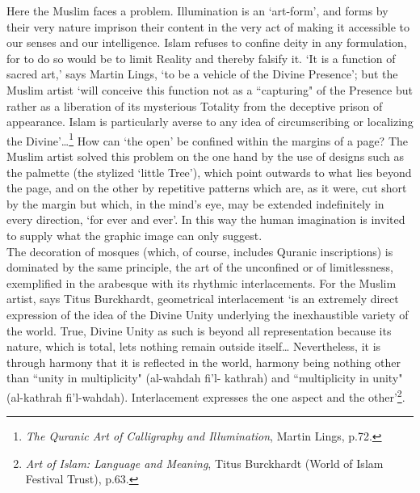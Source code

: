 \documentclass[10pt, twoside,openright]{book}
\begin{document}
Here the Muslim faces a problem. Illumination is an `art\hyp{}form', and forms by their very nature 
imprison their content in the very act of making it accessible to our senses and our intelligence. 
Islam refuses to confine deity in any formulation, for to do so would be to limit Reality and thereby 
falsify it. `It is a function of sacred art,' says Martin Lings, `to be a vehicle of the Divine 
Presence'; but the Muslim artist `will conceive this function not as a ``capturing" of the Presence 
but rather as a liberation of its mysterious Totality from the deceptive prison of appearance. Islam 
is particularly averse to any idea of circumscribing or localizing the Divine'\ldots{}\footnote{\emph{The Quranic Art of Calligraphy and Illumination}, Martin Lings, p.72.} How can `the 
open' be confined within the margins of a page? The Muslim artist solved this problem on the one hand 
by the use of designs such as the palmette (the stylized `little Tree'), which point outwards to what 
lies beyond the page, and on the other by repetitive patterns which are, as it were, cut short by the 
margin but which, in the mind's eye, may be extended indefinitely in every direction, `for ever and 
ever'. In this way the human imagination is invited to supply what the graphic image can only 
suggest. \\

The decoration of mosques (which, of course, includes Quranic inscriptions) is dominated by the same 
principle, the art of the unconfined or of limitlessness, exemplified in the arabesque with its 
rhythmic interlacements. For the Muslim artist, says Titus Burckhardt, geometrical interlacement `is 
an extremely direct expression of the idea of the Divine Unity underlying the inexhaustible variety 
of the world. True, Divine Unity as such is beyond all representation because its nature, which is 
total, lets nothing remain outside itself\ldots{} Nevertheless, it is through harmony that it is 
reflected in the world, harmony being nothing other than ``unity in multiplicity" (al\hyp{}wahdah fi'l\hyp{}
kathrah) and ``multiplicity in unity" (al\hyp{}kathrah fi'l\hyp{}wahdah). Interlacement expresses the one aspect 
and the other'\footnote{\emph{Art of Islam: Language and Meaning}, Titus Burckhardt (World of Islam Festival Trust), p.63.}. \\
\end{document}
